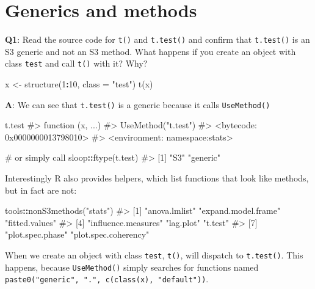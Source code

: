 \documentclass[
]{krantz}
\makeatletter
\newenvironment{Shaded}{\begin{snugshade}}{\end{snugshade}}
\newcommand{\CommentTok}[1]{\textcolor[rgb]{0.56,0.35,0.01}{\textit{#1}}}
\newcommand{\DataTypeTok}[1]{\textcolor[rgb]{0.13,0.29,0.53}{#1}}
\newcommand{\DecValTok}[1]{\textcolor[rgb]{0.00,0.00,0.81}{#1}}
\newcommand{\KeywordTok}[1]{\textcolor[rgb]{0.13,0.29,0.53}{\textbf{#1}}}
\newcommand{\NormalTok}[1]{#1}
\newcommand{\OperatorTok}[1]{\textcolor[rgb]{0.81,0.36,0.00}{\textbf{#1}}}
\newcommand{\StringTok}[1]{\textcolor[rgb]{0.31,0.60,0.02}{#1}}
\newenvironment{kframe}{%
\medskip{}
\setlength{\fboxsep}{.8em}
 \def\at@end@of@kframe{}%
 \ifinner\ifhmode%
  \def\at@end@of@kframe{\end{minipage}}%
  \begin{minipage}{\columnwidth}%
 \fi\fi%
 \def\FrameCommand##1{\hskip\@totalleftmargin \hskip-\fboxsep
 \colorbox{shadecolor}{##1}\hskip-\fboxsep
     \hskip-\linewidth \hskip-\@totalleftmargin \hskip\columnwidth}%
 \MakeFramed {\advance\hsize-\width
   \@totalleftmargin\z@ \linewidth\hsize
   \@setminipage}}%
 {\par\unskip\endMakeFramed%
 \at@end@of@kframe}
\renewenvironment{Shaded}{\begin{kframe}}{\end{kframe}}
\renewcommand{\KeywordTok} [1]{\textcolor[rgb]{0.00,0.44,0.13}{{#1}}}
\renewcommand{\DataTypeTok}[1]{\textcolor[rgb]{0.56,0.13,0.00}{{#1}}}
\renewcommand{\DecValTok}  [1]{\textcolor[rgb]{0.25,0.63,0.44}{{#1}}}
\renewcommand{\StringTok}  [1]{\textcolor[rgb]{0.25,0.44,0.63}{{#1}}}
\renewcommand{\CommentTok} [1]{\textcolor[rgb]{0.38,0.63,0.69}{{#1}}}
\renewcommand{\NormalTok}  [1]{{#1}}
\makeatother
\begin{document}
\hypertarget{generics-and-methods}{%
\section{Generics and methods}\label{generics-and-methods}}

\textbf{{Q1}}: Read the source code for \texttt{t()} and \texttt{t.test()} and confirm that \texttt{t.test()} is an S3 generic and not an S3 method. What happens if you create an object with class \texttt{test} and call \texttt{t()} with it? Why?

\begin{Shaded}
\begin{Highlighting}[]
\NormalTok{x <-}\StringTok{ }\KeywordTok{structure}\NormalTok{(}\DecValTok{1}\OperatorTok{:}\DecValTok{10}\NormalTok{, }\DataTypeTok{class =} \StringTok{"test"}\NormalTok{)}
\KeywordTok{t}\NormalTok{(x)}
\end{Highlighting}
\end{Shaded}

\textbf{{A}}: We can see that \texttt{t.test()} is a generic because it calls \texttt{UseMethod()}

\begin{Shaded}
\begin{Highlighting}[]
\NormalTok{t.test}
\CommentTok{#> function (x, ...) }
\CommentTok{#> UseMethod("t.test")}
\CommentTok{#> <bytecode: 0x0000000013798010>}
\CommentTok{#> <environment: namespace:stats>}

\CommentTok{# or simply call}
\NormalTok{sloop}\OperatorTok{::}\KeywordTok{ftype}\NormalTok{(t.test)}
\CommentTok{#> [1] "S3"      "generic"}
\end{Highlighting}
\end{Shaded}

Interestingly R also provides helpers, which list functions that look like methods, but in fact are not:

\begin{Shaded}
\begin{Highlighting}[]
\NormalTok{tools}\OperatorTok{::}\KeywordTok{nonS3methods}\NormalTok{(}\StringTok{"stats"}\NormalTok{)}
\CommentTok{#> [1] "anova.lmlist"        "expand.model.frame"  "fitted.values"      }
\CommentTok{#> [4] "influence.measures"  "lag.plot"            "t.test"             }
\CommentTok{#> [7] "plot.spec.phase"     "plot.spec.coherency"}
\end{Highlighting}
\end{Shaded}

When we create an object with class \texttt{test}, \texttt{t()}, will dispatch to \texttt{t.test()}. This happens, because \texttt{UseMethod()} simply searches for functions named \texttt{paste0("generic",\ ".",\ c(class(x),\ "default"))}.
\end{document}
